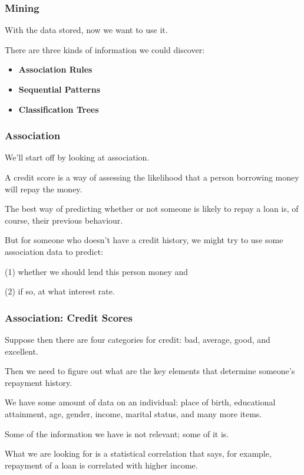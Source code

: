 \begin{frame}
\frametitle{Mining}

With the data stored, now we want to use it.

 There are three kinds of information we could discover:

\begin{itemize}
	\item \textbf{Association Rules}
	\item \textbf{Sequential Patterns}
	\item \textbf{Classification Trees}
\end{itemize}

\end{frame}

\begin{frame}
\frametitle{Association}

We'll start off by looking at association. 

A credit score is a way of assessing the likelihood that a person borrowing money will repay the money.

The best way of predicting whether or not someone is likely to repay a loan is, of course, their previous behaviour. 

But for someone who doesn't have a credit history, we might try to use some association data to predict: 

(1) whether we should lend this person money and 

(2) if so, at what interest rate.

\end{frame}

\begin{frame}
\frametitle{Association: Credit Scores}

Suppose then there are four categories for credit: bad, average, good, and excellent. 

Then we need to figure out what are the key elements that determine someone's repayment history. 

We have some amount of data on an individual: place of birth, educational attainment, age, gender, income, marital status, and many more items. 

Some of the information we have is  not relevant; some of it is. 

What we are looking for is a statistical correlation that says, for example, repayment of a loan is correlated with higher income.


\end{frame}


